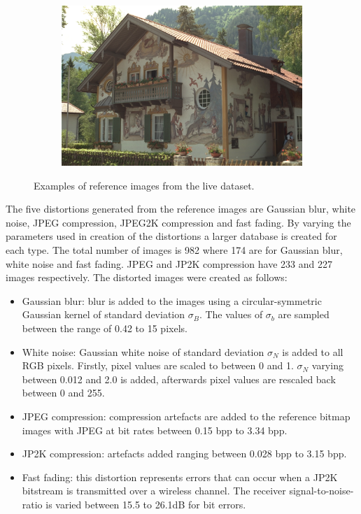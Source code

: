\begin{figure}[H]
\begin{subfigure}[b]{0.4\textwidth}
        \caption{}\label{fig:}
    \end{subfigure}
    \begin{subfigure}[b]{0.4\textwidth}
	    \center
	    \includegraphics[width=\textwidth]{Figs/Implementation/paintedhouse.pdf}
	    \caption{}\label{fig:}
    \end{subfigure}
    \caption{Examples of reference images from the \gls{live} dataset.}
    \label{fig:live_ex}
\end{figure} 

The five distortions generated from the reference images are Gaussian blur, white noise, JPEG compression, JPEG2K compression and fast fading. By varying the parameters used in creation of the distortions a larger database is created for each type. The total number of images is 982 where 174 are for Gaussian blur, white noise and fast fading. JPEG and JP2K compression have 233 and 227 images respectively. The distorted images were created as follows:

\begin{itemize}
	\item Gaussian blur: blur is added to the images using a circular-symmetric Gaussian kernel of standard deviation $\sigma_B$. The values of $\sigma_b$ are sampled between the range of 0.42 to 15 pixels.
	\item White noise: Gaussian white noise of standard deviation $\sigma_N$ is added to all RGB pixels. Firstly, pixel values are scaled to between 0 and 1. $\sigma_N$ varying between 0.012 and 2.0 is added, afterwards pixel values are rescaled back between 0 and 255.
	\item JPEG compression: compression artefacts are added to the reference bitmap images with JPEG at bit rates between 0.15 \gls{bpp} to 3.34 \gls{bpp}.
	\item JP2K compression: artefacts added ranging between 0.028 \gls{bpp} to 3.15 \gls{bpp}.
	\item Fast fading: this distortion represents errors that can occur when a JP2K bitstream is transmitted over a wireless channel. The receiver signal-to-noise-ratio is varied between 15.5 to 26.1dB for bit errors.
\end{itemize}

